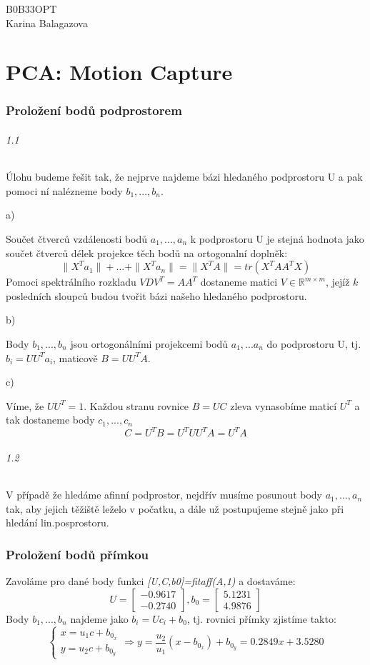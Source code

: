 \documentclass[11pt]{article}
\begin{document}
\begin{flushright}
B0B33OPT\\
Karina Balagazova
\end{flushright}
\part*{PCA: Motion Capture}

\section{Proložení bodů podprostorem}

\paragraph*{1.1}
Úlohu budeme řešit tak, že nejprve najdeme bázi hledaného podprostoru U a pak pomoci ní nalézneme body $ b_{1},...,b_{n} $.

\subparagraph*{a)}
Součet čtverců vzdálenosti bodů $ a_{1},...,a_{n} $ k podprostoru U je stejná hodnota jako součet čtverců délek projekce těch bodů na ortogonalní doplněk:
$$\| X^{T}a_{1} \| + ... + \| X^{T}a_{n} \| = \| X^{T}A \| = tr(X^{T}AA^{T}X)$$
Pomoci spektrálního rozkladu $VDV^{T} = AA^{T}$ dostaneme matici $V \in \mathbb{R}^{m\times m}$, jejíž $k$ posledních sloupců budou tvořit bázi našeho hledaného podprostoru.

\subparagraph*{b)}
Body $b_{1},...,b_{n}$ jsou ortogonálními projekcemi bodů $a_{1},...a_{n}$ do podprostoru U, tj. $b_{i} = UU^{T}a_{i}$, maticově $B = UU^{T}A$.

\subparagraph*{c)}
Víme, že $UU^{T}=1$. Každou stranu rovnice $B = UC$ zleva vynasobíme maticí $U^{T}$ a tak dostaneme body $c_{1},...,c_{n}$
$$C = U^{T}B = U^{T}UU^{T}A = U^{T}A$$ 


\paragraph*{1.2}
V případě že hledáme afinní podprostor, nejdřív musíme posunout body $ a_{1},...,a_{n} $ tak, aby jejich těžiště leželo v počatku, a dále už postupujeme stejně jako při hledání lin.posprostoru.

\section{Proložení bodů přímkou}

Zavoláme pro dané body funkci \textit{[U,C,b0]=fitaff(A,1)} a dostaváme:
$$ U = 
\begin{bmatrix}
-0.9617\\
-0.2740
\end{bmatrix}, 
b_{0} = 
\begin{bmatrix}
5.1231\\
4.9876
\end{bmatrix}
$$
Body $b_{1},...,b_{n}$ najdeme jako $b_{i} = Uc_{i} + b_{0}$, tj. rovnici přímky zjistíme takto: 
$$\begin{cases} x = u_{1}c + b_{0_{x}} \\ y = u_{2}c + b_{0_{y}}\end{cases} \Rightarrow y = \dfrac{u_{2}}{u_{1}} (x - b_{0_{x}}) + b_{0_{y}} = 0.2849x + 3.5280$$
\end{document}
